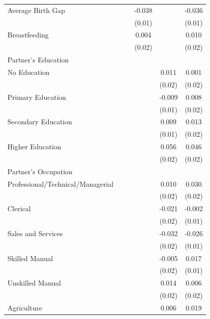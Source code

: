 \begin{longtable}{l*{5}{c}}
Average Birth Gap & & & -0.038\sym{***} & & -0.036\sym{***} \\
                    & & & (0.01) & & (0.01) \\
Breastfeeding & & & 0.004 & & 0.010 \\
                    & & & (0.02) & & (0.02) \\
\multicolumn{6}{l}{Partner's Education} \\
\hspace{1em}No Education & & & & 0.011 & 0.001 \\
                    & & & & (0.02) & (0.02) \\
\hspace{1em}Primary Education & & & & -0.009 & 0.008 \\
                    & & & & (0.01) & (0.02) \\
\hspace{1em}Secondary Education & & & & 0.009 & 0.013 \\
                    & & & & (0.01) & (0.02) \\
\hspace{1em}Higher Education & & & & 0.056\sym{**} & 0.046\sym{*} \\
                    & & & & (0.02) & (0.02) \\
\multicolumn{6}{l}{Partner's Occupation} \\
\hspace{1em}Professional/Technical/Managerial & & & & 0.010 & 0.030 \\
                    & & & & (0.02) & (0.02) \\
\hspace{1em}Clerical & & & & -0.021 & -0.002 \\
                    & & & & (0.02) & (0.01) \\
\hspace{1em}Sales and Services & & & & -0.032\sym{**} & -0.026\sym{*} \\
                    & & & & (0.02) & (0.01) \\
\hspace{1em}Skilled Manual & & & & -0.005 & 0.017 \\
                    & & & & (0.02) & (0.01) \\
\hspace{1em}Unskilled Manual & & & & 0.014 & 0.006 \\
                    & & & & (0.02) & (0.02) \\
\hspace{1em}Agriculture & & & & 0.006 & 0.019 \\

\end{longtable}
